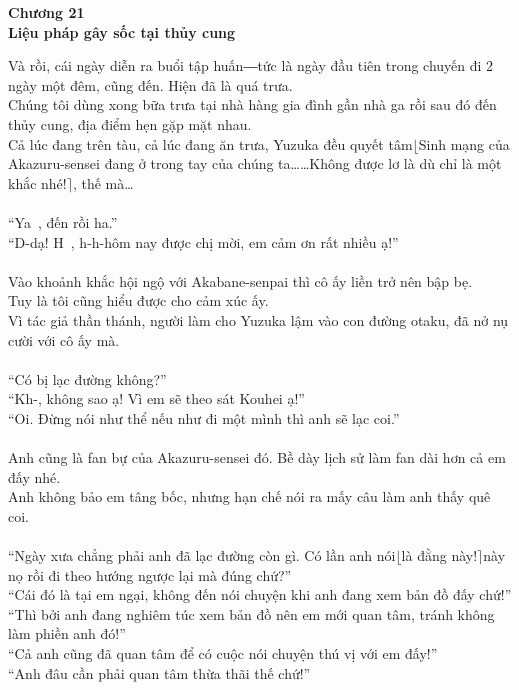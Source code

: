\documentclass[12pt,a4paper, twosides]{book}
\begin{document}
    \begin{center}
    \textbf{\large Chương 21 \\ Liệu pháp gây sốc tại thủy cung}
    \end{center}
    \noindent
Và rồi, cái ngày diễn ra buổi tập huấn―tức là ngày đầu tiên trong chuyến đi 2 ngày một đêm, cũng đến. Hiện đã là quá trưa.\\
Chúng tôi dùng xong bữa trưa tại nhà hàng gia đình gần nhà ga rồi sau đó đến thủy cung, địa điểm hẹn gặp mặt nhau.\\
Cả lúc đang trên tàu, cả lúc đang ăn trưa, Yuzuka đều quyết tâm$\lfloor$Sinh mạng của Akazuru-sensei đang ở trong tay của chúng ta……Không được lơ là dù chỉ là một khắc nhé!$\rceil$, thế mà…\\
\\
“Ya~, đến rồi ha.”\\
“D-dạ! H~, h-h-hôm nay được chị mời, em cảm ơn rất nhiều ạ!”\\
\\
Vào khoảnh khắc hội ngộ với Akabane-senpai thì cô ấy liền trở nên bập bẹ.\\
Tuy là tôi cũng hiểu được cho cảm xúc ấy.\\
Vì tác giả thần thánh, người làm cho Yuzuka lậm vào con đường otaku, đã nở nụ cười với cô ấy mà.\\
\\
“Có bị lạc đường không?”\\
“Kh-, không sao ạ! Vì em sẽ theo sát Kouhei ạ!”\\
“Oi. Đừng nói như thể nếu như đi một mình thì anh sẽ lạc coi.”\\
\\
Anh cũng là fan bự của Akazuru-sensei đó. Bề dày lịch sử làm fan dài hơn cả em đấy nhé.\\
Anh không bảo em tâng bốc, nhưng hạn chế nói ra mấy câu làm anh thấy quê coi.\\
\\
“Ngày xưa chẳng phải anh đã lạc đường còn gì. Có lần anh nói$\lfloor$là đằng này!$\rceil$này nọ rồi đi theo hướng ngược lại mà đúng chứ?”\\
“Cái đó là tại em ngại, không đến nói chuyện khi anh đang xem bản đồ đấy chứ!”\\
“Thì bởi anh đang nghiêm túc xem bản đồ nên em mới quan tâm, tránh không làm phiền anh đó!”\\
“Cả anh cũng đã quan tâm để có cuộc nói chuyện thú vị với em đấy!”\\
“Anh đâu cần phải quan tâm thừa thãi thế chứ!”\\
\end{document}
